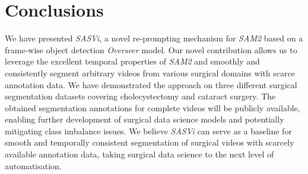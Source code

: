 \section{Conclusions}
\label{sec:concl}

We have presented \emph{SASVi}, a novel re-prompting mechanism for \emph{SAM2} based on a frame-wise object detection \emph{Overseer} model. Our novel contribution allows us to leverage the excellent temporal properties of \emph{SAM2} and smoothly and consistently segment arbitrary videos from various surgical domains with scarce annotation data. We have demonstrated the approach on three different surgical segmentation datasets covering cholecystectomy and cataract surgery. The obtained segmentation annotations for complete videos will be publicly available, enabling further development of surgical data science models and potentially mitigating class imbalance issues. We believe \emph{SASVi} can serve as a baseline for smooth and temporally consistent segmentation of surgical videos with scarcely available annotation data, taking surgical data science to the next level of automatisation.
